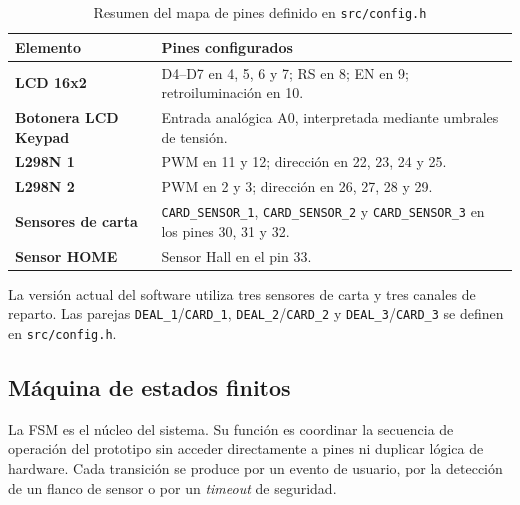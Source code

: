 \begin{table}[H]
\centering
\small
\begin{tabularx}{\textwidth}{>{\bfseries}p{}X}
\hline
\textbf{Elemento} & \textbf{Pines configurados} \\
\hline
LCD 16x2 & D4--D7 en 4, 5, 6 y 7; RS en 8; EN en 9; retroiluminación en 10. \\
Botonera LCD Keypad & Entrada analógica A0, interpretada mediante umbrales de tensión. \\
L298N 1 & PWM en 11 y 12; dirección en 22, 23, 24 y 25. \\
L298N 2 & PWM en 2 y 3; dirección en 26, 27, 28 y 29. \\
Sensores de carta & \texttt{CARD\_SENSOR\_1}, \texttt{CARD\_SENSOR\_2} y \texttt{CARD\_SENSOR\_3} en los pines 30, 31 y 32. \\
Sensor HOME & Sensor Hall en el pin 33. \\
\hline
\end{tabularx}
\caption{Resumen del mapa de pines definido en \texttt{src/config.h}}
\label{tab:pin_map}
\end{table}

La versión actual del software utiliza tres sensores de carta y tres canales de reparto. Las parejas \texttt{DEAL\_1}/\texttt{CARD\_1}, \texttt{DEAL\_2}/\texttt{CARD\_2} y \texttt{DEAL\_3}/\texttt{CARD\_3} se definen en \texttt{src/config.h}.

\subsection{Máquina de estados finitos}

La FSM es el núcleo del sistema. Su función es coordinar la secuencia de operación del prototipo sin acceder directamente a pines ni duplicar lógica de hardware. Cada transición se produce por un evento de usuario, por la detección de un flanco de sensor o por un \textit{timeout} de seguridad.


